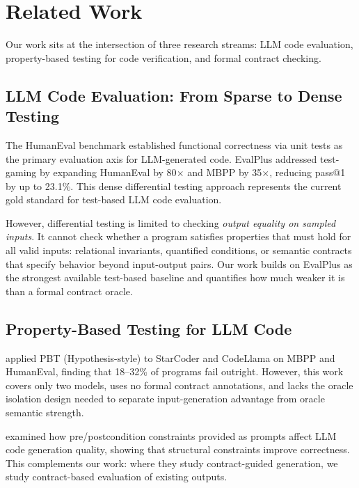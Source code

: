 \section{Related Work}
\label{sec:related}

Our work sits at the intersection of three research streams: LLM code evaluation, property-based testing for code verification, and formal contract checking.

\subsection{LLM Code Evaluation: From Sparse to Dense Testing}

The HumanEval benchmark \citep{Chen2021HumanEval} established functional correctness via unit tests as the primary evaluation axis for LLM-generated code. EvalPlus \citep{Liu2023EvalPlus} addressed test-gaming by expanding HumanEval by 80$\times$ and MBPP by 35$\times$, reducing pass@1 by up to 23.1\%. This dense differential testing approach represents the current gold standard for test-based LLM code evaluation.

However, differential testing is limited to checking \emph{output equality on sampled inputs}. It cannot check whether a program satisfies properties that must hold for all valid inputs: relational invariants, quantified conditions, or semantic contracts that specify behavior beyond input-output pairs. Our work builds on EvalPlus as the strongest available test-based baseline and quantifies how much weaker it is than a formal contract oracle.

\subsection{Property-Based Testing for LLM Code}

\citet{Bose2025Prompts} applied PBT (Hypothesis-style) to StarCoder and CodeLlama on MBPP and HumanEval, finding that 18--32\% of programs fail outright. However, this work covers only two models, uses no formal contract annotations, and lacks the oracle isolation design needed to separate input-generation advantage from oracle semantic strength.

\citet{Newcomb2025Preconditions} examined how pre/postcondition constraints provided as prompts affect LLM code generation quality, showing that structural constraints improve correctness. This complements our work: where they study contract-guided generation, we study contract-based evaluation of existing outputs.

